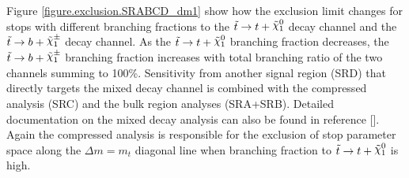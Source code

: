 \indent Figure \ref{figure.exclusion.SRABCD_dm1} show how the exclusion limit changes for stops with different branching fractions to the $\stop \rightarrow t+\ninoone$ decay channel and the $\stop \rightarrow b+\chinoonepm$ decay channel.  As the $\stop \rightarrow t+\ninoone$ branching fraction decreases, the $\stop \rightarrow b+\chinoonepm$ branching fraction increases with total branching ratio of the two channels summing to 100\%.  Sensitivity from another signal region (SRD) that directly targets the mixed decay channel is combined with the compressed analysis (SRC) and the bulk region analyses (SRA+SRB).  Detailed documentation on the mixed decay analysis can also be found in reference [\cite{stop0LCONF}].  Again the compressed analysis is responsible for the exclusion of stop parameter space along the $\Delta m = m_{t}$ diagonal line when branching fraction to $\stop \rightarrow t+\ninoone$ is high. \\

